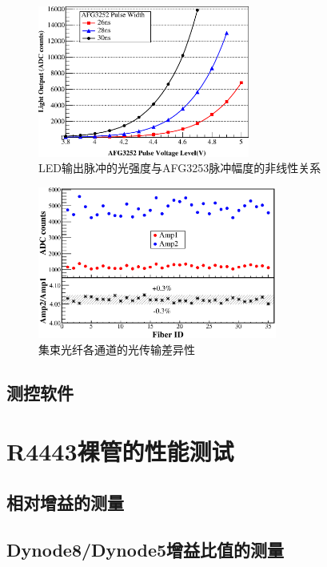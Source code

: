 \begin{figure}[htbp]
	\centering
	\includegraphics[width=0.62\textwidth]{chap/pmt_test/fig/led_response.eps}
	\caption{LED输出脉冲的光强度与AFG3253脉冲幅度的非线性关系}
	\label{fig:pmt_test:led_response}
\end{figure}

\begin{figure}[htbp]
	\centering
	\includegraphics[width=0.7\textwidth]{chap/pmt_test/fig/fiber_difference.eps}
	\caption{集束光纤各通道的光传输差异性}
	\label{fig:pmt_test:fiber_difference}
\end{figure}

\subsection{测控软件}


\section{R4443裸管的性能测试}

\subsection{相对增益的测量}
\subsection{Dynode8/Dynode5增益比值的测量}
